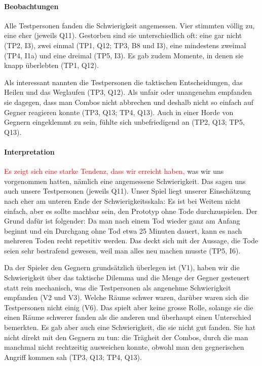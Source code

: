 \documentclass[../Main.tex]{subfiles}
\begin{document}
\paragraph{Beobachtungen}
Alle Testpersonen fanden die Schwierigkeit angemessen. Vier stimmten völlig zu, eine eher (jeweils Q11). Gestorben sind sie unterschiedlich oft: eine gar nicht (TP2, I3), zwei einmal (TP1, Q12; TP3, B8 und I3), eine mindestens zweimal (TP4, I1a) und eine dreimal (TP5, I3). Es gab zudem Momente, in denen sie knapp überlebten (TP1, Q12).

Als interessant nannten die Testpersonen die taktischen Entscheidungen, das Heilen und das Weglaufen (TP3, Q12). Als unfair oder unangenehm empfanden sie dagegen, dass man Combos nicht abbrechen und deshalb nicht so einfach auf Gegner reagieren konnte (TP3, Q13; TP4, Q13). Auch in einer Horde von Gegnern eingeklemmt zu sein, fühlte sich unbefriedigend an (TP2, Q13; TP5, Q13).

\paragraph{Interpretation}
\textcolor{red}{Es zeigt sich eine starke Tendenz, dass wir erreicht haben,} was wir uns vorgenommen hatten, nämlich eine angemessene Schwierigkeit. Das sagen uns auch unsere Testpersonen (jeweils Q11). Unser Spiel liegt unserer Einschätzung nach eher am unteren Ende der Schwierigkeitsskala: Es ist bei Weitem nicht einfach, aber es sollte machbar sein, den Prototyp ohne Tode durchzuspielen. Der Grund dafür ist folgender: Da man nach einem Tod wieder ganz am Anfang beginnt und ein Durchgang ohne Tod etwa 25 Minuten dauert, kann es nach mehreren Toden recht repetitiv werden. Das deckt sich mit der Aussage, die Tode seien sehr bestrafend gewesen, weil man alles neu machen musste (TP5, I6).

Da der Spieler den Gegnern grundsätzlich überlegen ist (V1), haben wir die Schwierigkeit über das taktische Dilemma und die Menge der Gegner gesteuert statt rein mechanisch, was die Testpersonen als angenehme Schwierigkeit empfanden (V2 und V3). Welche Räume schwer waren, darüber waren sich die Testpersonen nicht einig (V6). Das spielt aber keine grosse Rolle, solange sie die einen Räume schwerer fanden als die anderen und überhaupt einen Unterschied bemerkten. Es gab aber auch eine Schwierigkeit, die sie nicht gut fanden. Sie hat nicht direkt mit den Gegnern zu tun: die Trägheit der Combos, durch die man manchmal nicht rechtzeitig ausweichen konnte, obwohl man den gegnerischen Angriff kommen sah (TP3, Q13; TP4, Q13).
\end{document}
